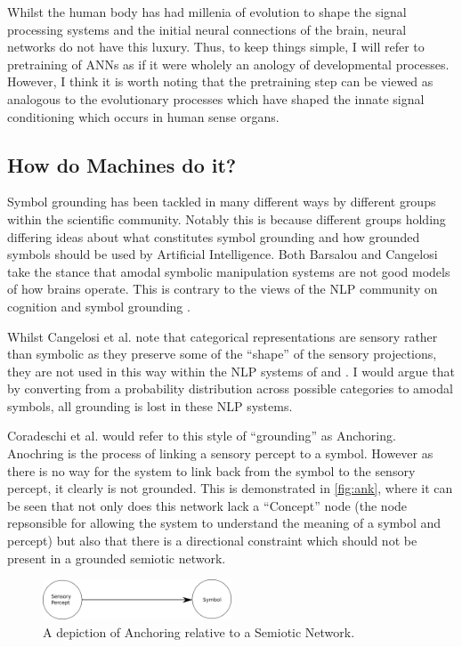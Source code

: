 Whilst the human body has had millenia of evolution to shape the signal processing systems and the initial neural connections of the brain, neural networks do not have this luxury. Thus, to keep things simple, I will refer to pretraining of \acp{ANN} as if it were wholely an anology of developmental processes. However, I think it is worth noting that the pretraining step can be viewed as analogous to the evolutionary processes which have shaped the innate signal conditioning which occurs in human sense organs.

\subsection{How do Machines do it?}
Symbol grounding has been tackled in many different ways by different groups within the scientific community. Notably this is because different groups holding differing ideas about what constitutes symbol grounding and how grounded symbols should be used by Artificial Intelligence. Both Barsalou \cite{barsalou2008grounded} and Cangelosi \cite{cangelosi2000robotic} take the stance that amodal symbolic manipulation systems are not good models of how brains operate. This is contrary to the views of the \ac{NLP} community on cognition and symbol grounding \cite{lemonlearning, yu2017learning}.

Whilst Cangelosi et al. note that categorical representations are sensory rather than symbolic as they preserve some of the ``shape'' of the sensory projections, they are not used in this way within the \ac{NLP} systems of \cite{lemonlearning} and \cite{yu2017learning}. I would argue that by converting from a probability distribution across possible categories to amodal symbols, all grounding is lost in these \ac{NLP} systems.

Coradeschi et al. \cite{coradeschi2000anchoring, coradeschi2003introduction} would refer to this style of ``grounding'' as Anchoring. Anochring is the process of linking a sensory percept to a symbol. However as there is no way for the system to link back from the symbol to the sensory percept, it clearly is not grounded. This is demonstrated in \autoref{fig:ank}, where it can be seen that not only does this network lack a ``Concept'' node (the node repsonsible for allowing the system to understand the meaning of a symbol and percept) but also that there is a directional constraint which should not be present in a grounded semiotic network. 

\begin{figure}
\centering
\includegraphics[width=0.5\textwidth]{Figs/litReview/anchoring.png}
\caption{A depiction of Anchoring relative to a Semiotic Network.}
\label{fig:ank}

\end{figure}


